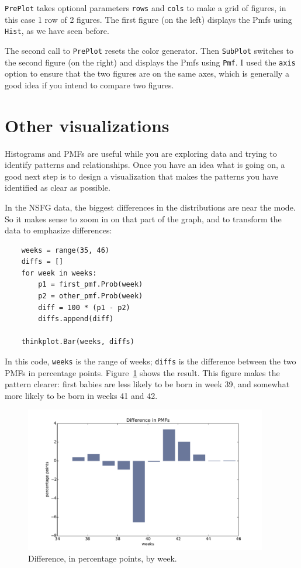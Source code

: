 \documentclass[12pt]{book}
\begin{document}
{\tt PrePlot} takes optional parameters {\tt rows} and {\tt cols}
to make a grid of figures, in this case 1 row of 2 figures.
The first figure (on the left) displays the Pmfs using {\tt Hist},
as we have seen before.

The second call to {\tt PrePlot} resets the color generator.  Then
{\tt SubPlot} switches to the second figure (on the right) and
displays the Pmfs using {\tt Pmf}.  I used the {\tt axis} option
to ensure that the two figures are on the same axes, which is
generally a good idea if you intend to compare two figures.


\section{Other visualizations}
\label{visualization}

Histograms and PMFs are useful while you are exploring data and
trying to identify patterns and relationships.
Once you have an idea what is going on, a good next step is to
design a visualization that makes the patterns you have identified
as clear as possible.

In the NSFG data, the biggest differences in the distributions are
near the mode.  So it makes sense to zoom in on that part of the
graph, and to transform the data to emphasize differences:

\begin{verbatim}
    weeks = range(35, 46)
    diffs = []
    for week in weeks:
        p1 = first_pmf.Prob(week)
        p2 = other_pmf.Prob(week)
        diff = 100 * (p1 - p2)
        diffs.append(diff)

    thinkplot.Bar(weeks, diffs)
\end{verbatim}

In this code, {\tt weeks} is the range of weeks; {\tt diffs} is the
difference between the two PMFs in percentage points.
Figure~\ref{probability_nsfg_diffs} shows the result.  This figure
makes the pattern clearer: first babies are less likely to be born in
week 39, and somewhat more likely to be born in weeks 41 and 42.

\begin{figure}
\centerline{\includegraphics[height=2.5in]{figs/probability_nsfg_diffs.pdf}}
\caption{Difference, in percentage points, by week.}
\label{probability_nsfg_diffs}
\end{figure}
\end{document}
